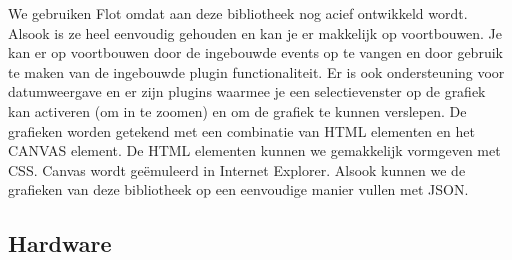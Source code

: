 We gebruiken Flot omdat aan deze bibliotheek nog acief ontwikkeld wordt. Alsook is ze heel eenvoudig gehouden en kan je er makkelijk op voortbouwen. Je kan er op voortbouwen door de ingebouwde events op te vangen en door gebruik te maken van de ingebouwde plugin functionaliteit. Er is ook ondersteuning voor datumweergave en er zijn plugins waarmee je een selectievenster op de grafiek kan activeren (om in te zoomen) en om de grafiek te kunnen verslepen.
De grafieken worden getekend met een combinatie van HTML elementen en het CANVAS element. De HTML elementen kunnen we gemakkelijk vormgeven met CSS. Canvas wordt ge\"emuleerd in Internet Explorer. Alsook kunnen we de grafieken van deze bibliotheek op een eenvoudige manier vullen met JSON.

\subsection{Hardware}

